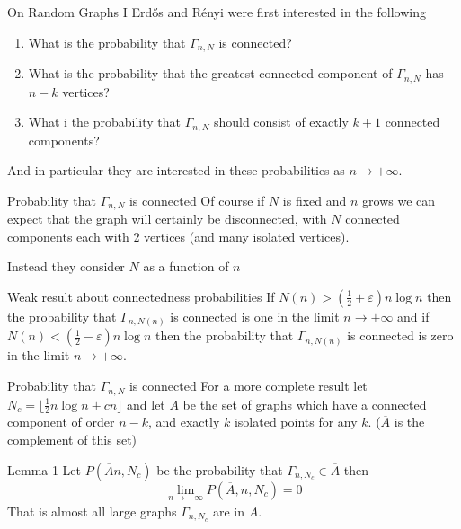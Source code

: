 \documentclass{beamer}
\begin{document}
\begin{frame}{On Random Graphs I}
	Erd\H{o}s and R\'enyi were first interested in the following
	\begin{enumerate}
		\item What is the probability that $\Gamma_{n,N}$ is connected?
		\item What is the probability that the greatest connected component of $\Gamma_{n,N}$ has $n-k$ vertices?
		\item What i the probability that $\Gamma_{n,N}$ should consist of exactly $k+1$ connected components?
	\end{enumerate}
	And in particular they are interested in these probabilities as $n\rightarrow +\infty$. 
	
	
\end{frame}

\begin{frame}{Probability that $\Gamma_{n,N}$ is connected}
	Of course if $N$ is fixed and $n$ grows we can expect that the graph will certainly be disconnected, with $N$ connected components each with 2 vertices (and many isolated vertices). 
	
	Instead they consider $N$ as a function of $n$
	
	\begin{block}{Weak result about connectedness probabilities}
		If $N(n)>\left(\frac{1}{2}+\varepsilon\right)n\log n$ then the probability that $\Gamma_{n,N(n)}$ is connected is one in the limit $n\rightarrow +\infty$ and if $N(n)<\left(\frac{1}{2}-\varepsilon\right)n\log n$ then the probability that $\Gamma_{n,N(n)}$ is connected is zero in the limit $n\rightarrow +\infty$. 
	\end{block}
\end{frame}

\begin{frame}{Probability that $\Gamma_{n,N}$ is connected}
	For a more complete result let $N_c=\lfloor\frac{1}{2}n\log n+cn \rfloor$ and let $A$ be the set of graphs which have a connected component of order $n-k$, and  exactly $k$ isolated points for any $k$. ($\overline{{A}}$ is the complement of this set)
	
	\begin{block}{Lemma 1}
		Let $P(\overline{A}n,N_c)$ be the probability that $\Gamma_{n,N_c}\in \overline{A}$ then
		$$\lim_{n\rightarrow +\infty}P(\overline{A},n,N_c)=0$$
		That is almost all large graphs $\Gamma_{n,N_c}$ are in $A$. 
	\end{block}
\end{frame}
\end{document}
